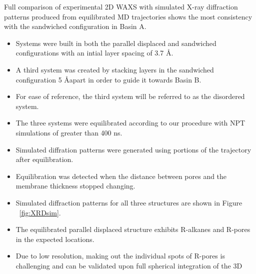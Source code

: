 \documentclass{article}
\newcommand{\angstrom}{\textup{\AA}}
\begin{document}
  Full comparison of experimental 2D WAXS with simulated X-ray diffraction
  patterns produced from equilibrated MD trajectories shows the most consistency
  with the sandwiched configuration in Basin A.
  \begin{itemize}
  	\item Systems were built in both the parallel displaced and sandwiched 
	configurations with an intial layer spacing of 3.7 \angstrom.
	\item A third system was created by stacking layers in the sandwiched 
	configuration 5 \angstrom apart in order to guide it towards Basin B.
	\item For ease of reference, the third system will be referred to as the disordered system. 
	\item The three systems were equilibrated according to our procedure with
	NPT simulations of greater than 400 ns.
	\item Simulated diffration patterns were generated using portions of the
	trajectory after equilibration.
	\item Equilibration was detected when the distance between pores and the 
	membrane thickness stopped changing.
	\item Simulated diffraction patterns for all three structures are shown in 
	Figure ~\ref{fig:XRDsim}. 
	\item The equilibrated parallel displaced structure exhibits R-alkanes and
	R-pores in the expected locations. 
	\item Due to low resolution, making out the individual spots of R-pores is
	challenging and can be validated upon full spherical integration of the 3D 

\end{itemize}
\end{document}
